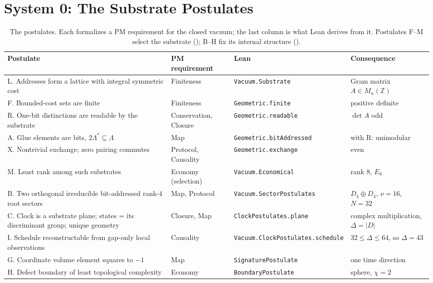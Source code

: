 \section{System 0: The Substrate Postulates}
\label{sec:System0_vacuum_requirements}

\begin{table}[t]
\centering
\begin{tabular}{>{\raggedright\arraybackslash}p{}>{\raggedright\arraybackslash}p{}>{\raggedright\arraybackslash}p{}>{\raggedright\arraybackslash}p{}}
\toprule
\textbf{Postulate} & \textbf{PM requirement} & \textbf{Lean} & \textbf{Consequence}\\
\midrule
L. Addresses form a lattice with integral symmetric cost & Finiteness & \texttt{Vacuum.Substrate} & Gram matrix $A\in M_n(\mathbb Z)$\\
F. Bounded-cost sets are finite & Finiteness & \texttt{Geometric.finite} & positive definite\\
R. One-bit distinctions are readable by the substrate & Conservation, Closure & \texttt{Geometric.readable} & $\det A$ odd\\
A. Glue elements are bits, $2\Lambda^*\subseteq\Lambda$ & Map & \texttt{Geometric.bitAddressed} & with R: unimodular\\
X. Nontrivial exchange; zero pairing commutes & Protocol, Causality & \texttt{Geometric.exchange} & even\\
M. Least rank among such substrates & Economy (selection) & \texttt{Vacuum.Economical} & rank 8, $E_8$\\
\midrule
B. Two orthogonal irreducible bit-addressed rank-4 root sectors & Map, Protocol & \texttt{Vacuum.SectorPostulates} & $D_4\oplus D_4$, $\nu=16$, $N=32$\\
C. Clock is a substrate plane; states = its discriminant group; unique geometry & Closure, Map & \texttt{ClockPostulates.plane} & complex multiplication, $\Delta=|D|$\\
I. Schedule reconstructable from gap-only local observations & Causality & \texttt{Vacuum.ClockPostulates.schedule} & $32\le\Delta\le64$, so $\Delta=43$\\
G. Coordinate volume element squares to $-1$ & Map & \texttt{SignaturePostulate} & one time direction\\
H. Defect boundary of least topological complexity & Economy & \texttt{BoundaryPostulate} & sphere, $\chi=2$\\
\bottomrule
\end{tabular}
\caption{The postulates. Each formalizes a PM requirement for the closed vacuum; the last column is what Lean derives from it. Postulates F--M select the substrate (); B--H fix its internal structure ().}
\label{tab:postulates}
\end{table}

